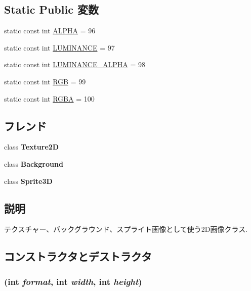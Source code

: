 \subsection*{Static Public 変数}
\begin{CompactItemize}
\item 
static const int \hyperlink{classm3g_1_1Image2D_417581fcde4067111f47320edb2aa378}{ALPHA} = 96
\item 
static const int \hyperlink{classm3g_1_1Image2D_3cf02f5117269e8ff112cbf5ecb790cd}{LUMINANCE} = 97
\item 
static const int \hyperlink{classm3g_1_1Image2D_1a74b878039f244c27120cacb4eb6a3e}{LUMINANCE\_\-ALPHA} = 98
\item 
static const int \hyperlink{classm3g_1_1Image2D_5f237f1b0f2ce6351e9e4a494b8dc759}{RGB} = 99
\item 
static const int \hyperlink{classm3g_1_1Image2D_0aaf9f2f4c064633c6d2888ec2c39e92}{RGBA} = 100
\end{CompactItemize}
\subsection*{フレンド}
\begin{CompactItemize}
\item 
\hypertarget{classm3g_1_1Image2D_a70951a0328ba29f64176f16b3ea47d8}{
class \textbf{Texture2D}}
\label{classm3g_1_1Image2D_a70951a0328ba29f64176f16b3ea47d8}

\item 
\hypertarget{classm3g_1_1Image2D_d70dac188b152e81b4323bb274bee959}{
class \textbf{Background}}
\label{classm3g_1_1Image2D_d70dac188b152e81b4323bb274bee959}

\item 
\hypertarget{classm3g_1_1Image2D_639cf38c41878a4f0fc8d24c010c96de}{
class \textbf{Sprite3D}}
\label{classm3g_1_1Image2D_639cf38c41878a4f0fc8d24c010c96de}

\end{CompactItemize}


\subsection{説明}
テクスチャー、バックグラウンド、スプライト画像として使う2D画像クラス. 

\subsection{コンストラクタとデストラクタ}
\hypertarget{classm3g_1_1Image2D_cea21be298c6584490d2b714c4b29d6b}{
\subsubsection[{Image2D}]{ (int {\em format}, \/  int {\em width}, \/  int {\em height})}}
\label{classm3g_1_1Image2D_cea21be298c6584490d2b714c4b29d6b}


